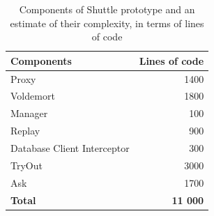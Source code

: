 \begin{table}[ht]
\centering
\begin{tabular}{lr}
\textbf{Components} 		& \textbf{Lines of code} \\ \hline
Proxy                      	& 1400    			\\   
Voldemort                  	& 1800    			\\
Manager                    	& 100     			\\    
Replay 			           	& 900     			\\    
Database Client Interceptor & 300     			\\     
TryOut                      & 3000    			\\    
Ask                         & 1700    			\\  \hline  
\textbf{Total}              & \textbf{11 000}  \\        
\end{tabular}
	\caption[Components of Shuttle prototype and an estimate of their complexity]
			{Components of Shuttle prototype and an estimate of their complexity, in terms of lines of code}
	\label{tab:lines_of_code}
\end{table}

